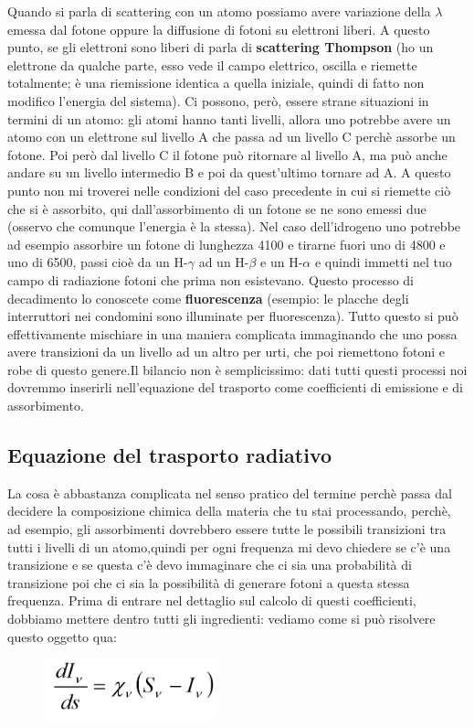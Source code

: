 \documentclass[a4paper,11pt]{article}
\begin{document}
\newline
Quando si parla di scattering con un atomo possiamo avere variazione della $\lambda$ emessa dal fotone oppure la diffusione di fotoni su elettroni liberi.
\newline
A questo punto, se gli elettroni sono liberi di parla di \textbf{scattering Thompson} (ho un elettrone da qualche parte, esso vede il campo elettrico, oscilla e riemette totalmente; è una riemissione identica a quella iniziale, quindi di fatto non modifico l'energia del sistema). Ci possono, però, essere strane situazioni in termini di un atomo: gli atomi hanno tanti livelli, allora uno potrebbe avere un atomo con un elettrone sul livello A che passa ad un livello C perchè assorbe un fotone. Poi però dal livello C il fotone può ritornare al livello A, ma può anche andare su un livello intermedio B e poi da quest'ultimo tornare ad A. A questo punto non mi troverei nelle condizioni del caso precedente in cui si riemette ciò che si è assorbito, qui dall'assorbimento di un fotone se ne sono emessi due (osservo che comunque l'energia è la stessa). Nel caso dell'idrogeno uno potrebbe ad esempio assorbire un fotone di lunghezza 4100 e tirarne fuori uno di 4800 e uno di 6500, passi cioè da un H-$\gamma$ ad un H-$\beta$ e un H-$\alpha$ e quindi immetti nel tuo campo di radiazione fotoni che prima non esistevano. Questo processo di decadimento lo conoscete come \textbf{fluorescenza} (esempio: le placche degli interruttori nei condomini sono illuminate per fluorescenza).
\newline
Tutto questo si può effettivamente mischiare in una maniera complicata immaginando che uno possa avere transizioni da un livello ad un altro per urti, che poi riemettono fotoni e robe di questo genere.Il bilancio non è semplicissimo: dati tutti questi processi noi dovremmo inserirli nell'equazione del trasporto come coefficienti di emissione e di assorbimento.
\subsection{Equazione del trasporto radiativo}
La cosa è abbastanza complicata nel senso pratico del termine perchè passa dal decidere la composizione chimica della materia che tu stai processando, perchè, ad esempio, gli assorbimenti dovrebbero essere tutte le possibili transizioni tra tutti i livelli di un atomo,quindi per ogni frequenza mi devo chiedere se c'è una transizione e se questa c'è devo immaginare che ci sia una probabilità di transizione poi che ci sia la possibilità di generare fotoni a questa stessa frequenza.
\newline
Prima di entrare nel dettaglio sul calcolo di questi coefficienti, dobbiamo mettere dentro tutti gli ingredienti: vediamo come si può risolvere questo oggetto qua:
\begin{figure}[h]
    \centering
    \includegraphics [width=5cm]{28-10.10(equazione_del_trasporto_radiativo).png}
    \label{fig:equazione_trasporto_radiativo}
\end{figure}
\end{document}
